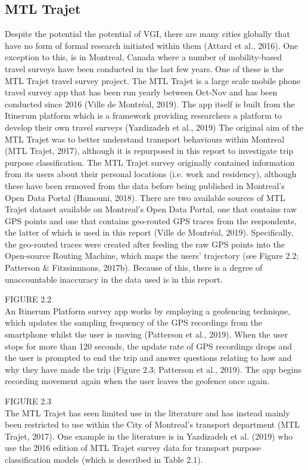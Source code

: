 \subsection{MTL Trajet}
Despite the potential the potential of VGI, there are many cities globally that have no form of formal research initiated within them (Attard et al., 2016). One exception to this, is in Montreal, Canada where a number of mobility-based travel surveys have been conducted in the last few years. One of these is the MTL Trajet travel survey project.
The MTL Trajet is a large scale mobile phone travel survey app that has been run yearly between Oct-Nov and has been conducted since 2016 (Ville de Montr\'eal, 2019). The app itself is built from the Itinerum platform which is a framework providing researchers a platform to develop their own travel surveys (Yazdizadeh et al., 2019)
The original aim of the MTL Trajet was to better understand transport behaviours within Montreal (MTL Trajet, 2017), although it is repurposed in this report to investigate trip purpose classification. The MTL Trajet survey originally contained information from its users about their personal locations (i.e. work and residency), although these have been removed from the data before being published in Montreal’s Open Data Portal (Hamouni, 2018).
There are two available sources of MTL Trajet dataset available on Montreal’s Open Data Portal, one that contains raw GPS points and one that contains geo-routed GPS traces from the respondents, the latter of which is used in this report (Ville de Montr\'eal, 2019). Specifically, the geo-routed traces were created after feeding the raw GPS points into the Open-source Routing Machine, which maps the users’ trajectory (see Figure 2.2; Patterson \& Fitzsimmons, 2017b). Because of this, there is a degree of unaccountable inaccuracy in the data used is in this report.

FIGURE 2.2
\\

An Itinerum Platform survey app works by employing a geofencing technique, which updates the sampling frequency of the GPS recordings from the smartphone whilst the user is moving (Patterson et al., 2019). When the user stops for more than 120 seconds, the update rate of GPS recordings drops and the user is prompted to end the trip and answer questions relating to how and why they have made the trip (Figure 2.3; Patterson et al., 2019). The app begins recording movement again when the user leaves the geofence once again.

FIGURE 2.3
\\

The MTL Trajet has seen limited use in the literature and has instead mainly been restricted to use within the City of Montreal’s transport department (MTL Trajet, 2017). One example in the literature is in Yazdizadeh et al. (2019) who use the 2016 edition of MTL Trajet survey data for transport purpose classification models (which is described in Table 2.1).
